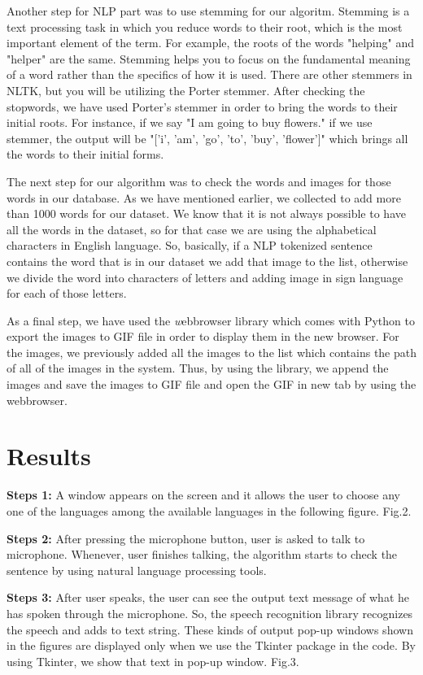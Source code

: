 \documentclass[twocolumn,10pt]{asme2ej}
\begin{document}
Another step for NLP part was to use stemming for our algoritm. Stemming is a text processing task in which you reduce words to their root, which is the most important element of the term. For example, the roots of the words "helping" and "helper" are the same. Stemming helps you to focus on the fundamental meaning of a word rather than the specifics of how it is used. There are other stemmers in NLTK, but you will be utilizing the Porter stemmer. After checking the stopwords, we have used Porter's stemmer in order to bring the words to their initial roots. For instance, if we say "I am going to buy flowers." if we use stemmer, the output will be "['i', 'am', 'go', 'to', 'buy', 'flower']" which brings all the words to their initial forms. 

The next step for our algorithm was to check the words and images for those words in our database. As we have mentioned earlier, we collected to add more than 1000 words for our dataset. We know that it is not always possible to have all the words in the dataset, so for that case we are using the alphabetical characters in English language. So, basically, if a NLP tokenized sentence contains the word that is in our dataset we add that image to the list, otherwise we divide the word into characters of letters and adding image in sign language for each of those letters. 

As a final step, we have used the {\emph webbrowser} library which comes with Python to export the images to GIF file in order to display them in the new browser. For the images, we previously added all the images to the list which contains the path of all of the images in the system. Thus, by using the library, we append the images and save the images to GIF file and open the GIF in new tab by using the webbrowser. 

\section{Results}
{\bf Steps 1:} A window appears on the screen and it
allows the user to choose any one of the languages among
the available languages in the following figure. Fig.2.

{\bf Steps 2:} After pressing the microphone button, user is asked to talk to microphone. Whenever, user finishes talking, the algorithm starts to check the sentence by using natural language processing tools. 

{\bf Steps 3:} After user speaks, the user can see the output text message of what he has spoken through the microphone. So, the speech recognition library recognizes the speech and adds to text string. These kinds of output pop-up windows shown in the figures are displayed only when we use the Tkinter package in the code. By using Tkinter, we show that text in pop-up window. Fig.3.
\end{document}
